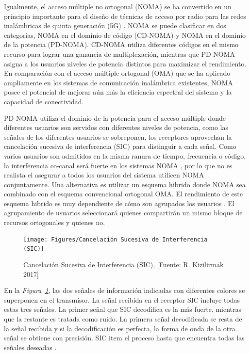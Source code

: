 Igualmente, el acceso múltiple no ortogonal (NOMA) se ha convertido en un principio importante para el diseño de técnicas de acceso por radio para las redes inalámbricas de quinta generación (5G) \parencite{DIng2017}. NOMA se puede clasificar en dos categorías, NOMA en el dominio de código (CD-NOMA) y NOMA en el dominio de la potencia (PD-NOMA). CD-NOMA utiliza diferentes códigos en el mismo recurso para lograr una ganancia de multiplexación, mientras que PD-NOMA asigna a los usuarios niveles de potencia distintos para maximizar el rendimiento. En comparación con el acceso múltiple ortogonal (OMA) que se ha aplicado ampliamente en los sistemas de comunicación inalámbrica existentes, NOMA posee el potencial de mejorar aún más la eficiencia espectral del sistema y la capacidad de conectividad.\newline

PD-NOMA utiliza el dominio de la potencia para el acceso múltiple donde diferentes usuarios son servidos con diferentes niveles de potencia, como las señales de los diferentes usuarios se sobreponen, los receptores aprovechan la cancelación sucesiva de interferencia (SIC) para distinguir a cada señal. Como varios usuarios son admitidos en la misma ranura de tiempo, frecuencia o código, la interferencia co-canal será fuerte en los sistemas NOMA \parencite{Ding2016}, por lo que no es realista el asegurar a todos los usuarios del sistema utilicen NOMA conjuntamente. Una alternativa es utilizar un esquema hibrido donde NOMA sea combinado con el esquema convencional ortogonal OMA. El rendimiento de este esquema hibrido es muy dependiente de cómo son agrupados los usuarios \parencite{Ding2016}. El agrupamiento de usuarios seleccionará quienes compartirán un mismo bloque de recursos ortogonales y quienes no.\newline

\begin{figure}[th]
\centering
\texttt{[image: Figures/Cancelación Sucesiva de Interferencia (SIC)]}
\decoRule
\caption[Cancelación Sucesiva de Interferencia (SIC)]{Cancelación Sucesiva de Interferencia (SIC), [Fuente: R. Kizilirmak 2017]}
\label{fig:SIC}
\end{figure}

En la \textit{Figura~\ref{fig:SIC}}, las dos señales de información indicadas con diferentes colores se superponen en el transmisor. La señal recibida en el receptor SIC incluye todas estas tres señales. La primer señal que SIC decodifica es la más fuerte, mientras que la restante es tratada como ruido. La primera señal decodificada se resta de la señal recibida y si la decodificación es perfecta, la forma de onda de la otra señal se obtiene con precisión. SIC itera el proceso hasta que encuentra todas las señales deseadas \parencite{Kizilirmak2016}.\newline

